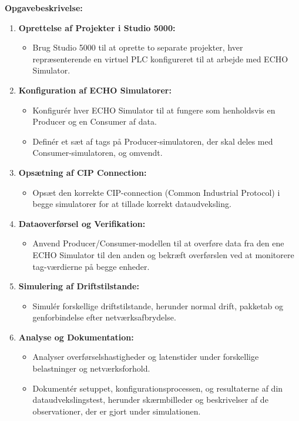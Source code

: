 \textbf{Opgavebeskrivelse:}
\begin{enumerate}
	\item \textbf{Oprettelse af Projekter i Studio 5000:}
	\begin{itemize}
		\item Brug Studio 5000 til at oprette to separate projekter, hver repræsenterende en virtuel PLC konfigureret til at arbejde med ECHO Simulator.
	\end{itemize}
	\item \textbf{Konfiguration af ECHO Simulatorer:}
	\begin{itemize}
		\item Konfigurér hver ECHO Simulator til at fungere som henholdsvis en Producer og en Consumer af data.
		\item Definér et sæt af tags på Producer-simulatoren, der skal deles med Consumer-simulatoren, og omvendt.
	\end{itemize}
	\item \textbf{Opsætning af CIP Connection:}
	\begin{itemize}
		\item Opsæt den korrekte CIP-connection (Common Industrial Protocol) i begge simulatorer for at tillade korrekt dataudveksling.
	\end{itemize}
	\item \textbf{Dataoverførsel og Verifikation:}
	\begin{itemize}
		\item Anvend Producer/Consumer-modellen til at overføre data fra den ene ECHO Simulator til den anden og bekræft overførslen ved at monitorere tag-værdierne på begge enheder.
	\end{itemize}
	\item \textbf{Simulering af Driftstilstande:}
	\begin{itemize}
		\item Simulér forskellige driftstilstande, herunder normal drift, pakketab og genforbindelse efter netværksafbrydelse.
	\end{itemize}
	\item \textbf{Analyse og Dokumentation:}
	\begin{itemize}
		\item Analyser overførselshastigheder og latenstider under forskellige belastninger og netværksforhold.
		\item Dokumentér setuppet, konfigurationsprocessen, og resultaterne af din dataudvekslingstest, herunder skærmbilleder og beskrivelser af de observationer, der er gjort under simulationen.
	\end{itemize}
\end{enumerate}


